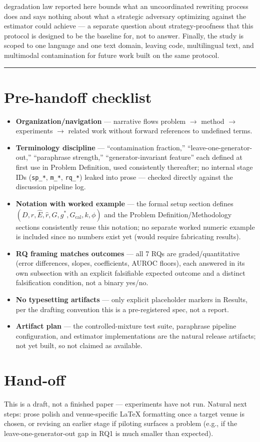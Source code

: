 \documentclass[11pt]{article}
\begin{document}
degradation law reported here bounds what an uncoordinated rewriting process does and says nothing about what a strategic adversary optimizing against the estimator could achieve --- a separate question about strategy-proofness that this protocol is designed to be the baseline for, not to answer. Finally, the study is scoped to one language and one text domain, leaving code, multilingual text, and multimodal contamination for future work built on the same protocol.

\vspace{1em}
\hrule
\vspace{1em}

\section*{Pre-handoff checklist}
\begin{itemize}[leftmargin=1.4em]
\item \textbf{Organization/navigation} --- narrative flows problem $\to$ method $\to$ experiments $\to$ related work without forward references to undefined terms.
\item \textbf{Terminology discipline} --- ``contamination fraction,'' ``leave-one-generator-out,'' ``paraphrase strength,'' ``generator-invariant feature'' each defined at first use in Problem Definition, used consistently thereafter; no internal stage IDs (\texttt{sp\_*}, \texttt{m\_*}, \texttt{rq\_*}) leaked into prose --- checked directly against the discussion pipeline log.
\item \textbf{Notation with worked example} --- the formal setup section defines $(D, r, \hat{E}, \hat{r}, G, g^*, G_{\text{cal}}, k, \phi)$ and the Problem Definition/Methodology sections consistently reuse this notation; no separate worked numeric example is included since no numbers exist yet (would require fabricating results).
\item \textbf{RQ framing matches outcomes} --- all 7 RQs are graded/quantitative (error differences, slopes, coefficients, AUROC floors), each answered in its own subsection with an explicit falsifiable expected outcome and a distinct falsification condition, not a binary yes/no.
\item \textbf{No typesetting artifacts} --- only explicit placeholder markers in Results, per the drafting convention this is a pre-registered spec, not a report.
\item \textbf{Artifact plan} --- the controlled-mixture test suite, paraphrase pipeline configuration, and estimator implementations are the natural release artifacts; not yet built, so not claimed as available.
\end{itemize}

\section*{Hand-off}
This is a draft, not a finished paper --- experiments have not run. Natural next steps: prose polish and venue-specific LaTeX formatting once a target venue is chosen, or revising an earlier stage if piloting surfaces a problem (e.g., if the leave-one-generator-out gap in RQ1 is much smaller than expected).



\end{document}
